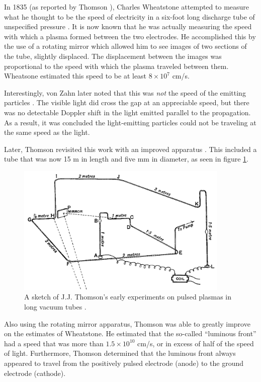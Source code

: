 In 1835 (as reported by Thomson \cite{Thomson1893}), Charles Wheatstone
attempted to measure what he thought to be the speed of electricity in a
six-foot long discharge tube of unspecified pressure \cite{Wheatstone1835}. It
is now known that he was actually measuring the speed with which a plasma formed
between the two electrodes. He accomplished this by the use of a rotating mirror
which allowed him to see images of two sections of the tube, slightly displaced.
The displacement between the images was proportional to the speed with which the
plasma traveled between them. Wheatsone estimated this speed to be at least
$8\times10^7$ cm/s.

Interestingly, von Zahn later noted that this was \emph{not} the speed of the
emitting particles \cite{Zahn1879}. The visible light did cross the gap at an
appreciable speed, but there was no detectable Doppler shift in the light
emitted parallel to the propagation. As a result, it was concluded the
light-emitting particles could not be traveling at the same speed as the light.

Later, Thomson revisited this work with an improved apparatus
\cite{Thomson1893}. This included a tube that was now 15 m in length and five mm
in diameter, as seen in figure \ref{fig:thomson}.
\begin{figure}
  \centering
  \includegraphics[width=4in]{chapters/introduction/figures/thomson.png}
  \caption{A sketch of J.J. Thomson's early experiments on pulsed plasmas 
  in long vacuum tubes \cite{Thomson1893}.}\label{fig:thomson}
\end{figure}
Also using the rotating mirror apparatus, Thomson was able to greatly improve on
the estimates of Wheatstone. He estimated that the so-called ``luminous front''
had a speed that was more than $1.5\times10^{10}$ cm/s, or in excess of half of
the speed of light. Furthermore, Thomson determined that the luminous front
always appeared to travel from the positively pulsed electrode (anode) to the
ground electrode (cathode).

